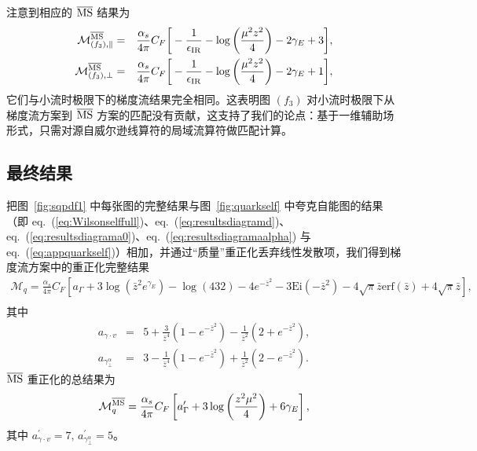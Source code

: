 注意到相应的 $\overline{\rm MS}$ 结果为 \cite{Izubuchi:2018srq}
\begin{eqnarray}
\mathcal{M}_{(f_3), \|}^{\overline{\rm MS}} &= &\frac{\alpha_s}{4\pi}C_F\bigg[-\frac{1}{\epsilon_{\rm IR}} - \log\left(\frac{\mu^2z^2}{4}\right) -2\gamma_E +3 \bigg],\\
\mathcal{M}_{(f_3), \perp}^{\overline{\rm MS}} &= &\frac{\alpha_s}{4\pi}C_F\bigg[-\frac{1}{\epsilon_{\rm IR}} - \log\left(\frac{\mu^2z^2}{4}\right) -2\gamma_E +1 \bigg],
\end{eqnarray}
它们与小流时极限下的梯度流结果完全相同。这表明图 $(f_3)$ 对小流时极限下从梯度流方案到
$\overline{\rm MS}$ 方案的匹配没有贡献，这支持了我们的论点：基于一维辅助场形式，只需对源自威尔逊线算符的局域流算符做匹配计算。

\subsection{最终结果}
把图~\ref{fig:sqpdf1} 中每张图的完整结果与图~\ref{fig:quarkself} 中夸克自能图的结果（即 eq.~(\ref{eq:Wilsonselffull})、eq.~(\ref{eq:resultsdiagramd})、
eq.~(\ref{eq:resultsdiagrama0})、eq.~(\ref{eq:resultsdiagramaalpha}) 与 eq.~(\ref{eq:appquarkself})）相加，并通过``质量''重正化丢弃线性发散项，我们得到梯度流方案中的重正化完整结果
\begin{eqnarray}
\label{eq:quarkquasiGFfull}
\mathcal{M}_{q} = \frac{\alpha_s}{4\pi}C_F\left[a_{\Gamma}  + 3\log\left(\bar{z}^2e^{\gamma_E}\right)-\log(432)-4e^{-\bar{z}^2} - 3\text{Ei}(-\bar{z}^2) -4\sqrt{\pi}\bar{z}\text{erf}(\bar{z}) + 4\sqrt{\pi}\bar{z} \right],\nonumber\\
\end{eqnarray}
其中
\begin{eqnarray}
a_{\gamma\cdot v}&=& 5 +\frac{3}{\bar{z}^4}\left(1-e^{-\bar{z}^2}\right) -\frac{1}{\bar{z}^2}\left(2+e^{-\bar{z}^2}\right),\\
a_{\gamma^{\alpha}_\perp}&=& 3 - \frac{1}{\bar{z}^4}\left(1-e^{-\bar{z}^2}\right) + \frac{1}{\bar{z}^2}\left(2-e^{-\bar{z}^2}\right).
\end{eqnarray}
$\overline{\rm MS}$ 重正化的总结果为
\begin{eqnarray}
\mathcal{M}_{q}^{\overline{\rm MS}} = \frac{\alpha_s}{4\pi}C_F\left[a^\prime_{\Gamma}+ 3\log\left(\frac{z^2\mu^2}{4}\right)+6\gamma_E\right],
\end{eqnarray}
其中 $a^\prime_{\gamma\cdot v} = 7,\, a^\prime_{\gamma^{\alpha}_\perp} = 5$。

